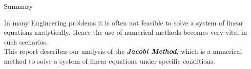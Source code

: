 \documentclass[main.tex]{subfiles}
\begin{document}
\vspace*{\fill}

{\Huge Summary\\}

    In many Engineering problems it is often not feasible to solve a system of linear 
    equations analytically. Hence the use of numerical methods becomes very vital in such scenarios.\vspace{0.5mm}\\ 
    
    This report describes our analysis of the \textbf{\textit{Jacobi Method}}, which is a numerical method to solve 
    a system of linear equations under specific conditions.
\vspace*{\fill}
    
\end{document}
